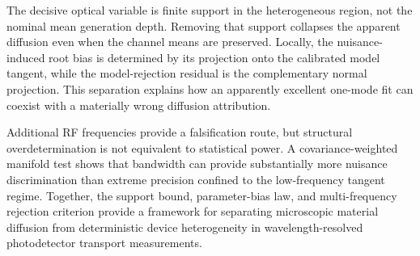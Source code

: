 \documentclass[aps,pra,twocolumn,superscriptaddress,nofootinbib]{revtex4-2}
\begin{document}
The decisive optical variable is finite support in the heterogeneous region, not the nominal mean generation depth. Removing that support collapses the apparent diffusion even when the channel means are preserved. Locally, the nuisance-induced root bias is determined by its projection onto the calibrated model tangent, while the model-rejection residual is the complementary normal projection. This separation explains how an apparently excellent one-mode fit can coexist with a materially wrong diffusion attribution.

Additional RF frequencies provide a falsification route, but structural overdetermination is not equivalent to statistical power. A covariance-weighted manifold test shows that bandwidth can provide substantially more nuisance discrimination than extreme precision confined to the low-frequency tangent regime. Together, the support bound, parameter-bias law, and multi-frequency rejection criterion provide a framework for separating microscopic material diffusion from deterministic device heterogeneity in wavelength-resolved photodetector transport measurements.



\end{document}
